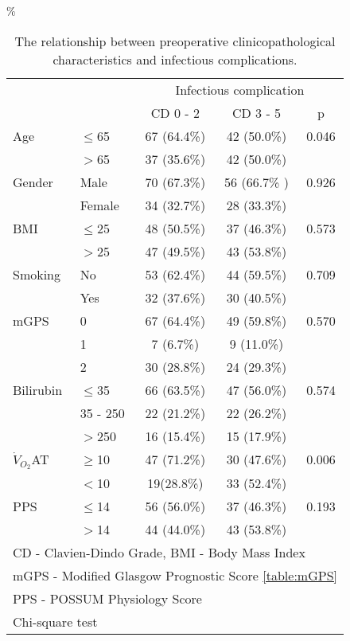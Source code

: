 \begin{table}[p]
	\centering
	\caption{The relationship between preoperative clinicopathological characteristics and infectious complications.}
	\label{table:crp_comp_preop_factors}
	\renewcommand{\arraystretch}{1.2} %
	\%\setlength{\tabcolsep}{12pt} %
	\begin{tabular}{|l l | c c c|}
		\hline
		                  &          &  \multicolumn{3}{c}{Infectious complication}   \\
		                  &          & CD 0 - 2    & CD 3 - 5     & p                 \\ \hline
		Age               & $\leq$65 & 67 (64.4\%) & 42 (50.0\%)  & 0.046             \\
		                  & $>$65    & 37 (35.6\%) & 42 (50.0\%)  &  \\
		Gender            & Male     & 70 (67.3\%) & 56 (66.7\% ) & 0.926             \\
		                  & Female   & 34 (32.7\%) & 28 (33.3\%)  &  \\
		BMI               & $\leq$25 & 48 (50.5\%) & 37 (46.3\%)  & 0.573             \\
		                  & $>$25    & 47 (49.5\%) & 43 (53.8\%)  &  \\
		Smoking           & No       & 53 (62.4\%) & 44 (59.5\%)  & 0.709             \\
		                  & Yes      & 32 (37.6\%) & 30 (40.5\%)  &  \\
		mGPS              & 0        & 67 (64.4\%) & 49 (59.8\%)  & 0.570             \\
		                  & 1        & 7 (6.7\%)   & 9 (11.0\%)   &  \\
		                  & 2        & 30 (28.8\%) & 24 (29.3\%)  &  \\
		Bilirubin         & $\leq$35 & 66 (63.5\%) & 47 (56.0\%)  & 0.574             \\
		                  & 35 - 250 & 22 (21.2\%) & 22 (26.2\%)  &  \\
		                  & $>$250   & 16 (15.4\%) & 15 (17.9\%)  &  \\
		$\dot{V}_{O_2}$AT & $\geq$10 & 47 (71.2\%) & 30 (47.6\%)  & 0.006             \\
		                  & $<$10    & 19(28.8\%)  & 33 (52.4\%)  &  \\
		PPS               & $\leq$14 & 56 (56.0\%) & 37 (46.3\%)  & 0.193             \\
		                  & $>$14    & 44 (44.0\%) & 43 (53.8\%)  &  \\ \hline
		\multicolumn{5}{l}{CD - Clavien-Dindo Grade, BMI - Body Mass Index}           \\
		\multicolumn{5}{l}{mGPS - Modified Glasgow Prognostic Score \ref{table:mGPS}} \\
		\multicolumn{5}{l}{PPS - POSSUM Physiology Score}                             \\
		\multicolumn{5}{l}{Chi-square test}
	\end{tabular}
\end{table}


		
		
		
